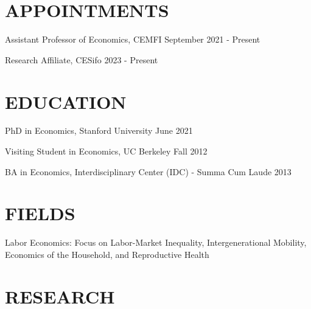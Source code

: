 \documentclass[margin]{res} %
\begin{document}
\begin{resume}


\section{APPOINTMENTS}

Assistant Professor of Economics, CEMFI \hfill September 2021 - Present

Research Affiliate, CESifo \hfill 2023 - Present


\section{EDUCATION}

PhD in Economics, Stanford University \hfill June 2021

Visiting Student in Economics, UC Berkeley  \hfill Fall 2012 

BA in Economics, Interdisciplinary Center (IDC) - Summa Cum Laude \hfill 2013

 
\section{FIELDS}  
 Labor Economics: Focus on Labor-Market Inequality, Intergenerational Mobility, Economics of the Household, and Reproductive Health
 

\section{ RESEARCH} 


\end{resume}
\end{document}
